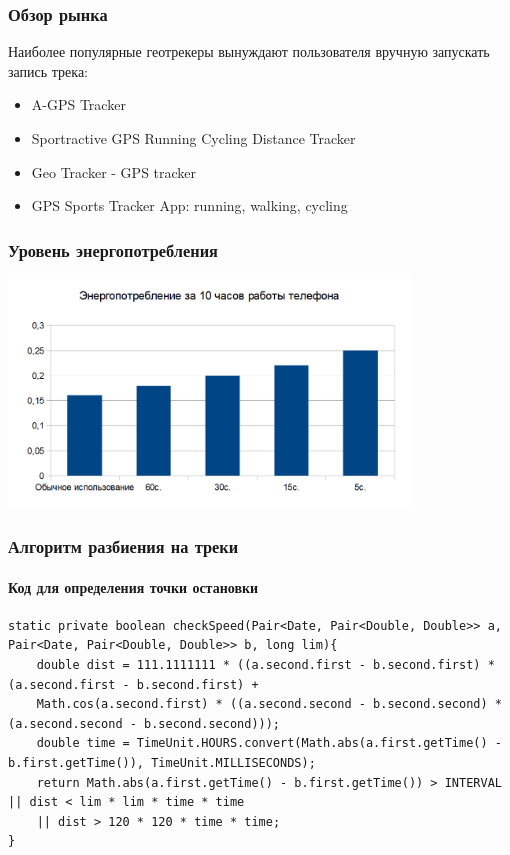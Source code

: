 \documentclass[hyperref={unicode}]{beamer}
\begin{document}
\begin{frame}
\frametitle{Обзор рынка}
Наиболее популярные геотрекеры вынуждают пользователя вручную запускать запись трека:
\begin{itemize}
	\item A-GPS Tracker
	\item Sportractive GPS Running Cycling Distance Tracker
	\item Geo Tracker - GPS tracker
	\item GPS Sports Tracker App: running, walking, cycling
\end{itemize}

\end{frame}
\begin{frame}
  \frametitle{Уровень энергопотребления}
	\begin{center}
		\includegraphics[width=0.8\textwidth]{images/Consuming.png}
	\end{center}
  
\end{frame}

\begin{frame}[fragile]
\frametitle{Алгоритм разбиения на треки}
\framesubtitle{Код для определения точки остановки}

\begin{verbatim}
static private boolean checkSpeed(Pair<Date, Pair<Double, Double>> a, Pair<Date, Pair<Double, Double>> b, long lim){
    double dist = 111.1111111 * ((a.second.first - b.second.first) * (a.second.first - b.second.first) +
    Math.cos(a.second.first) * ((a.second.second - b.second.second) * (a.second.second - b.second.second)));
    double time = TimeUnit.HOURS.convert(Math.abs(a.first.getTime() - b.first.getTime()), TimeUnit.MILLISECONDS);
    return Math.abs(a.first.getTime() - b.first.getTime()) > INTERVAL || dist < lim * lim * time * time
    || dist > 120 * 120 * time * time;
}
\end{verbatim}

\end{frame}
\end{document}
